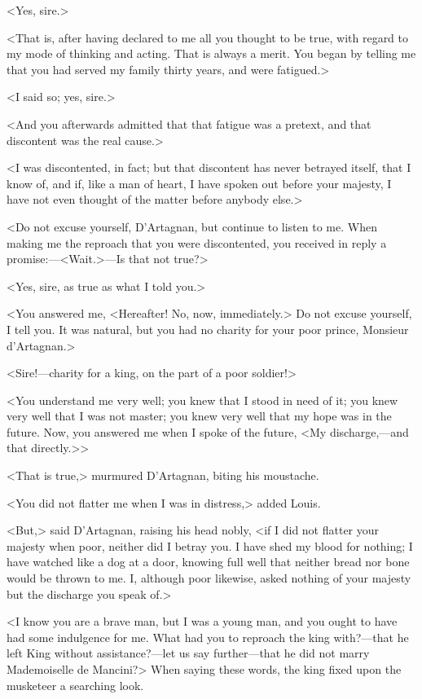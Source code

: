 <Yes, sire.>

<That is, after having declared to me all you thought to be true, with regard to my mode of thinking and acting. That is always a merit. You began by telling me that you had served my family thirty years, and were fatigued.>

<I said so; yes, sire.>

<And you afterwards admitted that that fatigue was a pretext, and that discontent was the real cause.>

<I was discontented, in fact; but that discontent has never betrayed itself, that I know of, and if, like a man of heart, I have spoken out before your majesty, I have not even thought of the matter before anybody else.>

<Do not excuse yourself, D'Artagnan, but continue to listen to me. When making me the reproach that you were discontented, you received in reply a promise:—<Wait.>—Is that not true?>

<Yes, sire, as true as what I told you.>

<You answered me, <Hereafter! No, now, immediately.> Do not excuse yourself, I tell you. It was natural, but you had no charity for your poor prince, Monsieur d'Artagnan.>

<Sire!—charity for a king, on the part of a poor soldier!>

<You understand me very well; you knew that I stood in need of it; you knew very well that I was not master; you knew very well that my hope was in the future. Now, you answered me when I spoke of the future, <My discharge,—and that directly.>>

<That is true,> murmured D'Artagnan, biting his moustache.

<You did not flatter me when I was in distress,> added Louis.

<But,> said D'Artagnan, raising his head nobly, <if I did not flatter your majesty when poor, neither did I betray you. I have shed my blood for nothing; I have watched like a dog at a door, knowing full well that neither bread nor bone would be thrown to me. I, although poor likewise, asked nothing of your majesty but the discharge you speak of.>

<I know you are a brave man, but I was a young man, and you ought to have had some indulgence for me. What had you to reproach the king with?—that he left King  without assistance?—let us say further—that he did not marry Mademoiselle de Mancini?> When saying these words, the king fixed upon the musketeer a searching look.


